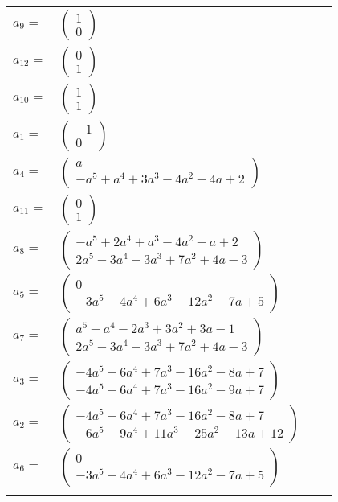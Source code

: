 \documentclass[1p]{elsarticle_modified}
\theoremstyle{definition}
\begin{document}
\begin{tabular}{m{7pt} m{180pt} m{7pt} m{180pt} }
\flushright $a_{9}=$&$\begin{pmatrix}1\\0\end{pmatrix}$ \\
\flushright $a_{12}=$&$\begin{pmatrix}0\\1\end{pmatrix}$ \\
\flushright $a_{10}=$&$\begin{pmatrix}1\\1\end{pmatrix}$ \\
\flushright $a_{1}=$&$\begin{pmatrix}-1\\0\end{pmatrix}$ \\
\flushright $a_{4}=$&$\begin{pmatrix}a\\- a^5+a^4+3 a^3-4 a^2-4 a+2\end{pmatrix}$ \\
\flushright $a_{11}=$&$\begin{pmatrix}0\\1\end{pmatrix}$ \\
\flushright $a_{8}=$&$\begin{pmatrix}- a^5+2 a^4+a^3-4 a^2- a+2\\2 a^5-3 a^4-3 a^3+7 a^2+4 a-3\end{pmatrix}$ \\
\flushright $a_{5}=$&$\begin{pmatrix}0\\-3 a^5+4 a^4+6 a^3-12 a^2-7 a+5\end{pmatrix}$ \\
\flushright $a_{7}=$&$\begin{pmatrix}a^5- a^4-2 a^3+3 a^2+3 a-1\\2 a^5-3 a^4-3 a^3+7 a^2+4 a-3\end{pmatrix}$ \\
\flushright $a_{3}=$&$\begin{pmatrix}-4 a^5+6 a^4+7 a^3-16 a^2-8 a+7\\-4 a^5+6 a^4+7 a^3-16 a^2-9 a+7\end{pmatrix}$ \\
\flushright $a_{2}=$&$\begin{pmatrix}-4 a^5+6 a^4+7 a^3-16 a^2-8 a+7\\-6 a^5+9 a^4+11 a^3-25 a^2-13 a+12\end{pmatrix}$ \\
\flushright $a_{6}=$&$\begin{pmatrix}0\\-3 a^5+4 a^4+6 a^3-12 a^2-7 a+5\end{pmatrix}$\\&\end{tabular}
\end{document}
